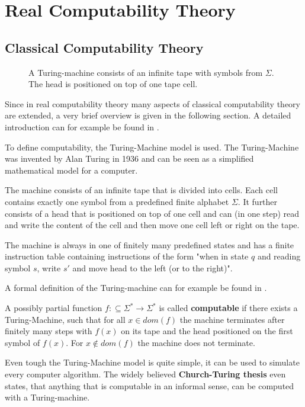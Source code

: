 \section{Real Computability Theory}\label{sec:real computability}
\subsection{Classical Computability Theory}
 \begin{figure}[h]
   \centering
   
   \caption{A Turing-machine consists of an infinite tape with symbols from
   $\Sigma$. The head is positioned on top of one tape cell.}
 \end{figure}
 Since in real computability theory many aspects of classical computability theory are extended, 
 a very brief overview is given in the following section. 
 A detailed introduction can for example be found in \cite{computability}.

 To define computability, the Turing-Machine model is used.
 The Turing-Machine was invented by Alan Turing in 1936 \cite{turing36} and can
 be seen as a simplified mathematical model for a computer.

 The machine consists of an infinite tape that is divided into cells. 
 Each cell contains exactly one symbol from a predefined finite alphabet
 $\Sigma$.
 It further consists of a head that is positioned on top of one cell 
 and can (in one step) read and write the content of the cell and then move one
 cell left or right on the tape.

 The machine is always in one of finitely many predefined states and has a finite
 instruction table containing instructions of the form "when in state $q$ and
 reading symbol $s$, write $s'$ and move head to the left (or to the right)".

 A formal definition of the Turing-machine can for example be found in \cite{hopcroft2013}.
 
 \begin{definition}
 	A possibly partial function $f:\subseteq \Sigma^* \to \Sigma^*$ is called \textbf{computable} if there exists 
 	a Turing-Machine, such that for all $x \in dom(f)$ the machine terminates after finitely many steps with $f(x)$ on its 
 	tape and the head positioned on the first symbol of $f(x)$. 
  For $x \not \in dom(f)$ the machine does not terminate.
 \end{definition}

 Even tough the Turing-Machine model is quite simple, it can be used to
 simulate every computer algorithm.
 The widely believed \textbf{Church-Turing thesis} even states, that anything
 that is computable in an informal sense, can be computed with a
 Turing-machine.

